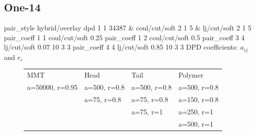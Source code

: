 \documentclass[a4paper]{article}
\begin{document}
\subsection*{One-14}
pair\_style hybrid/overlay dpd 1 1 34387 \& coul/cut/soft 2 1 5 \& 
lj/cut/soft 2 1 5\newline
pair\_coeff 1 1 coul/cut/soft 0.25
pair\_coeff 1 2 coul/cut/soft 0.5\newline
pair\_coeff 3 4 lj/cut/soft 0.07    10 3 3\newline
pair\_coeff 4 4 lj/cut/soft 0.85    10 3 3\newline
DPD coefficients: $a_{ij}$ and $r_c$
\begin{figure}[H]\begin{tabular}{llll}
MMT             & Head         & Tail         & Polymer      \\
a=50000, r=0.95 & a=500, r=0.8 & a=500, r=0.8 & a=500, r=0.8 \\
                & a=75,  r=0.8 & a=75,  r=0.8 & a=150, r=0.8 \\
                &              & a=75,  r=1   & a=250, r=1   \\
                &              &              & a=500, r=1   \\
\end{tabular}\end{figure}
\end{document}
